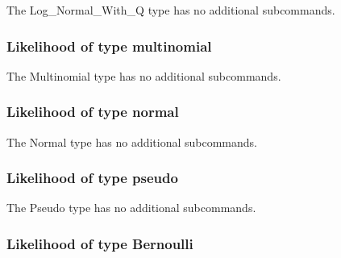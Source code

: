 The Log\_Normal\_With\_Q type has no additional subcommands.

\subsubsection{Likelihood of type multinomial}
\label{syntax:Likelihood-Multinomial}

The Multinomial type has no additional subcommands.

\subsubsection{Likelihood of type normal}
\label{syntax:Likelihood-Normal}

The Normal type has no additional subcommands.

\subsubsection{Likelihood of type pseudo}
\label{syntax:Likelihood-Pseudo}

The Pseudo type has no additional subcommands.

\subsubsection{Likelihood of type Bernoulli}
\label{syntax:Likelihood-Bernoulli}
